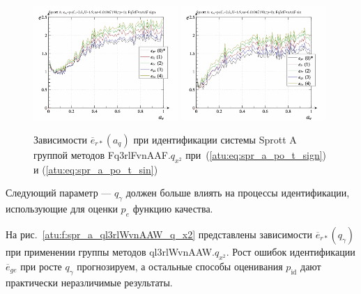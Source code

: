 \begin{figure}[htb!]
  \centerline{
    \includegraphics[width=0.49\textwidth]{p/cha/spr_a/Fq3rlFvnAAF_x2/sprott_a_id-p_a_q_sign.png}
    \hfill
    \includegraphics[width=0.49\textwidth]{p/cha/spr_a/Fq3rlFvnAAF_x2/sprott_a_id-p_a_q_sin.png}
  }
  \caption{Зависимости $\overline{e}_{r*}(a_q)$ при идентификации системы Sprott A группой методов Fq3rlFvnAAF.$q_{x^2}$
   при~(\ref{atu:eq:spr_a_po_t_sign}) и (\ref{atu:eq:spr_a_po_t_sin})}
  \label{atu:f:spr_a_a_q_Fq3rlFvnAAF_q_x2}
\end{figure}

Следующий параметр --- $q_\gamma$ должен больше влиять на процессы идентификации,
использующие для оценки $p_e$ функцию качества.

На рис.~\ref{atu:f:spr_a_ql3rlWvnAAW_q_x2} представлены зависимости
$\overline{e}_{r*}(q_\gamma)$ при применении группы методов ql3rlWvnAAW.$q_{x^2}$.
Рост ошибок идентификации $\overline{e}_{ge}$ при росте $q_\gamma$
прогнозируем, а остальные способы оценивания $p_\mathrm{id}$
дают практически неразличимые результаты.


